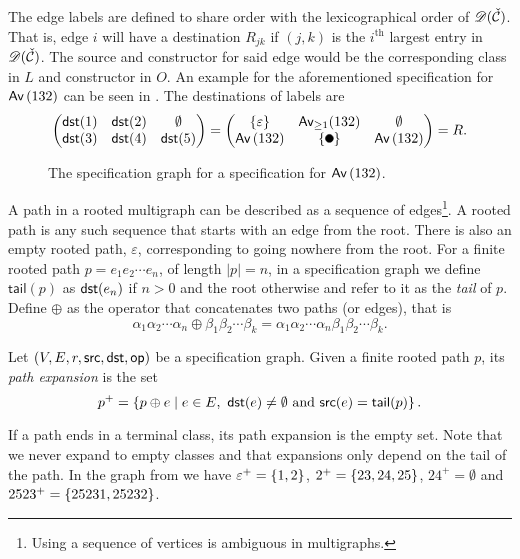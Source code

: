 The edge labels are defined to share order with the lexicographical order of $\mathscr{D}(\check{\mathcal{C}})$. That is, edge $i$ will have a destination $R_{jk}$ if $(j,k)$ is the $i^\text{th}$ largest entry in $\mathscr{D}(\check{\mathcal{C}})$. The source and constructor for said edge would be the corresponding class in $L$ and constructor in $O$. An example for the aforementioned specification for $\textsf{Av}\left(132\right)$ can be seen in . The destinations of labels are
\[
    \begin{pmatrix}
        \dst(1) & \dst(2) & \emptyset\\
        \dst(3) & \dst(4) & \dst(5)
    \end{pmatrix}
    =
    \begin{pmatrix}
    \set{\varepsilon} & \textsf{Av}_{\geq1}(132) & \emptyset \\
    \Av{132} & \set{\point{0.1}} & \Av{132}
    \end{pmatrix}
    = R.
\]

\begin{figure}[ht!]
    \centering
    
    \caption{The specification graph for a specification for $\textsf{Av}\left(132\right)$.}
    \label{fig:specgraph132}
\end{figure}

A path in a rooted multigraph can be described as a sequence of edges\footnote{Using a sequence of vertices is ambiguous in multigraphs.}. A rooted path is any such sequence that starts with an edge from the root. There is also an empty rooted path, $\varepsilon$, corresponding to going nowhere from the root. For a finite rooted path $p=e_1e_2\dotsm e_n$, of length $|p|=n$, in a specification graph we define $\textsf{tail}(p)$ as $\textsf{dst}(e_n)$ if $n>0$ and the root otherwise and refer to it as the \emph{tail} of $p$. Define $\oplus$ as the operator that concatenates two paths (or edges), that is
\[
    \alpha_1\alpha_2 \dotsm \alpha_n \oplus \beta_1\beta_2 \dotsm \beta_k = \alpha_1\alpha_2 \dotsm \alpha_n\beta_1\beta_2 \dotsm \beta_k.
\]

\begin{definition}
Let $(V,E,r,\textsf{src},\textsf{dst},\textsf{op})$ be a specification graph. Given a finite rooted path $p$, its \emph{path expansion} is the set 
\[
    p^+ = \left\{p \oplus e \mid e \in E, \ \textsf{dst}(e) \neq \emptyset \text{ and } \textsf{src}(e) = \textsf{tail}(p)\right\}.
\]
\end{definition}
If a path ends in a terminal class, its path expansion is the empty set. Note that we never expand to empty classes and that expansions only depend on the tail of the path. In the graph from  we have $\varepsilon^+ = \left\{1,2\right\}$, $2^+ = \left\{23,24,25\right\}$, $24^+ = \emptyset$ and $2523^+ = \left\{25231, 25232\right\}$.


